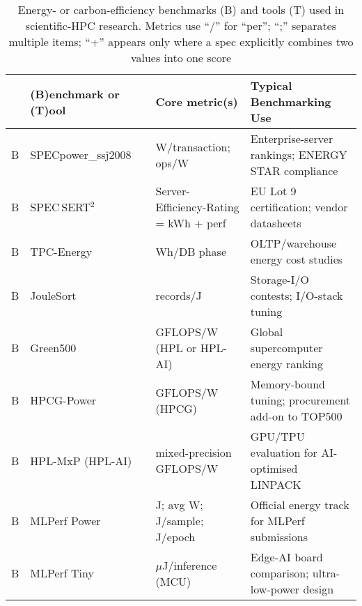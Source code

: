 
\begin{table*}[hptb]
  \centering
  \caption{
  Energy- or carbon-efficiency benchmarks (B) and tools (T) used in scientific-HPC research.  Metrics use ``/'' for ``per''; ``;'' separates multiple items; ``+'' appears only where a spec explicitly combines two values into one score
  }
  \label{tab:hpc_energy_catalog}
  \begin{tabularx}{1.0\textwidth}{|llllX|}
    \toprule
    & \headerfont\textbf{(B)enchmark or (T)ool}
    & 
    & \headerfont\textbf{Core metric(s) } %
    & \headerfont\textbf{Typical Benchmarking Use}\\ 
    \midrule
B & SPECpower\_ssj2008           & \cite{specpower}            & W/transaction; ops/W                & Enterprise-server rankings; ENERGY STAR compliance \\
B & SPEC\,SERT$^{2}$             & \cite{sert2}                & Server-Efficiency-Rating = kWh + perf    & EU Lot 9 certification; vendor datasheets \\
B & TPC-Energy                   & \cite{tpcenergy}            & Wh/DB phase                            & OLTP/warehouse energy cost studies \\
B & JouleSort                    & \cite{joulesort}            & records/J                              & Storage-I/O contests; I/O-stack tuning \\
B & Green500                     & \cite{green500}             & GFLOPS/W (HPL or HPL-AI)               & Global supercomputer energy ranking \\
B & HPCG-Power                   & \cite{hpcgpower}            & GFLOPS/W (HPCG)                        & Memory-bound tuning; procurement add-on to TOP500 \\
B & HPL-MxP (HPL-AI)             & \cite{hplmxphplai}          & mixed-precision GFLOPS/W               & GPU/TPU evaluation for AI-optimised LINPACK \\
B & MLPerf Power                 & \cite{mlperfpower}          & J; avg W; J/sample; J/epoch       & Official energy track for MLPerf submissions \\
B & MLPerf Tiny                  & \cite{mlperftiny}           & $\mu$J/inference (MCU)             & Edge-AI board comparison; ultra-low-power design \\

\end{tabularx}
\end{table*}
